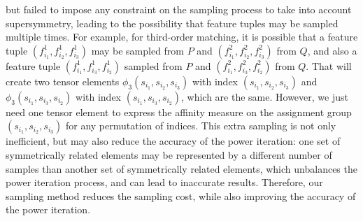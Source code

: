 but failed to impose any constraint on the sampling process to take into account supersymmetry,
leading to the possibility that feature tuples may be sampled multiple times.
For example, for third-order matching, it is possible that a feature tuple $(f_{i_1}^1, f_{i_2}^1, f_{i_3}^1)$ may be sampled from $P$ and $(f_{i_1}^2, f_{i_2}^2, f_{i_3}^2)$ from $Q$,
and also a feature tuple $(f_{i_1}^1, f_{i_3}^1, f_{i_2}^1)$ sampled from $P$ and $(f_{i_1}^2, f_{i_3}^2, f_{i_2}^2)$ from $Q$. That will create two tensor elements $\phi_3(s_{i_1}, s_{i_2}, s_{i_3})$ with index $(s_{i_1}, s_{i_2}, s_{i_3})$ and $\phi_3(s_{i_1}, s_{i_3}, s_{i_2})$ with index $(s_{i_1}, s_{i_3}, s_{i_2})$, which are the same. However, we just need one tensor element to express the affinity measure on the assignment group $(s_{i_1}, s_{i_2}, s_{i_3})$ for any permutation of indices.
This extra sampling is not only inefficient, but may also reduce the accuracy of the power iteration: one set of symmetrically related elements  may be represented by a different number of samples than another set of  symmetrically related elements, which unbalances the power iteration process, and can lead to inaccurate results.
Therefore, our sampling method reduces the sampling cost, while also improving the accuracy of the power iteration.
